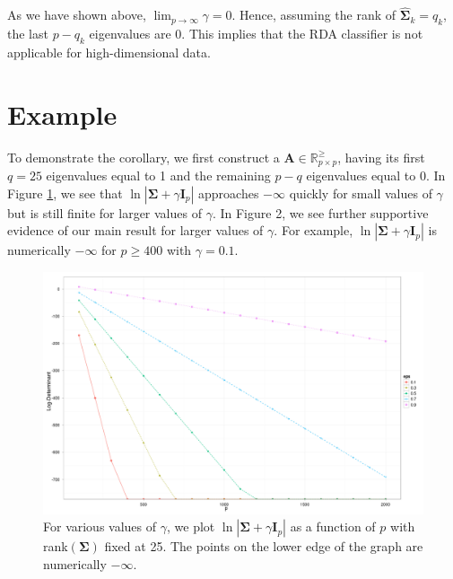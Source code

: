 \documentclass[11pt]{article}
\begin{document}
As we have shown above, $\lim_{p \rightarrow \infty} \gamma = 0$. Hence, assuming the rank of $\widehat{\bm\Sigma}_k = q_k$, the last $p-q_k$ eigenvalues are 0. This implies that the RDA classifier is not applicable for high-dimensional data.

\section{Example}

To demonstrate the corollary, we first construct a $\bm A \in \mathbb{R}_{p \times p}^{\ge}$, having its first $q = 25$ eigenvalues equal to 1 and the remaining $p - q$ eigenvalues equal to 0. In Figure \ref{fig:log-det}, we see that $\ln |\bm\Sigma + \gamma \bm I_p|$ approaches $-\infty$ quickly for small values of $\gamma$ but is still finite for larger values of $\gamma$. In Figure 2, we see further supportive evidence of our main result for larger values of $\gamma$. For example, $\ln |\bm\Sigma + \gamma \bm I_p|$ is numerically $-\infty$ for $p \ge 400$ with $\gamma = 0.1$.

\begin{figure}[htbp]
\begin{center}
\includegraphics[scale = 0.45]{log-determinant}
\caption{For various values of $\gamma$, we plot $\ln |\bm\Sigma + \gamma \bm I_p|$ as a function of $p$ with rank$(\bm\Sigma)$ fixed at 25. The points on the lower edge of the graph are numerically $-\infty$.}
\label{fig:log-det}
\end{center}
\end{figure}

%
%
%
\end{document}
